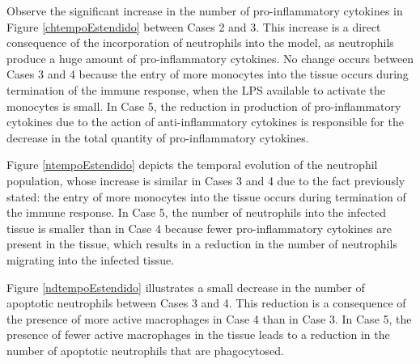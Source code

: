 \documentclass[10pt]{bmc_article}
\newenvironment{bmcformat}{\baselineskip20pt\sloppy\setboolean{publ}{false}}{\baselineskip20pt\sloppy}
\begin{document}
\begin{bmcformat}

Observe the significant increase in the number of pro-inflammatory cytokines in Figure \ref{chtempoEstendido} between Cases 2 and 3. 
This increase is a direct consequence of the incorporation of neutrophils into the model, as neutrophils produce a huge amount of 
pro-inflammatory cytokines. No change occurs between Cases 3 and 4 because the entry of more monocytes into the tissue occurs during 
termination of the immune response, when the LPS available to activate the monocytes is small. In Case 5, the reduction in production 
of pro-inflammatory cytokines due to the action of anti-inflammatory cytokines is responsible for the decrease in the total quantity 
of pro-inflammatory cytokines. 


Figure \ref{ntempoEstendido} depicts the temporal evolution of the neutrophil population, whose increase is similar in Cases 3 and 4 due 
to the fact previously stated: the entry of more monocytes into the tissue occurs during termination of the immune response. In Case 5, 
the number of neutrophils into the infected tissue is smaller than in Case 4 because fewer pro-inflammatory cytokines are present in the 
tissue, which results in a reduction in the number of neutrophils migrating into the infected tissue. 


Figure \ref{ndtempoEstendido} illustrates a small decrease in the number of apoptotic neutrophils between Cases 3 and 4. This reduction 
is a consequence of the presence of more active macrophages in Case 4 than in Case 3. In Case 5, the presence of fewer active macrophages 
in the tissue leads to a reduction in the number of apoptotic neutrophils that are phagocytosed.


\end{bmcformat}
\end{document}
